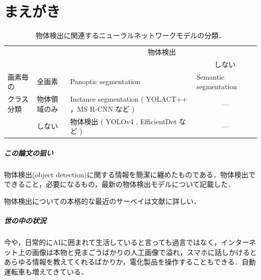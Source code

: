 \documentclass[twocolumn]{jsarticle} %
\begin{document}
\section{まえがき}
\begin{table}
    \caption{物体検出に関連するニューラルネットワークモデルの分類．}
    \label{tbl-select-l}
    \begin{center}
        \setlength{\doublerulesep}{0.5pt}
        \begin{tabularx}{\linewidth}{|p{1.7cm}|p{1.0cm}||X|p{3.6cm}|} \hline
            \multicolumn{2}{|c||}{} & \multicolumn{2}{c|}{物体検出} \\ \cline{3-4}
            \multicolumn{2}{|l||}{} & \centering{する} & \multicolumn{1}{c|}{しない} \\ \hline\hline
            画素毎の & 全画素 & Panoptic segmentation \cite{KHGRD19} & Semantic segmentation \\ \cline{2-4}
            クラス分類 & 物体領域のみ  & Instance segmentation ( YOLACT++ \cite{BZXL20}，MS R-CNN \cite{HHGHW19} など ) &  \multicolumn{1}{c|}{---} \\ \cline{2-4}
            & しない & 物体検出 ( YOLOv4 \cite{BWL20}, EfficientDet \cite{TPL20} など ) & \multicolumn{1}{c|}{---} \\ 
            \hline
        \end{tabularx}
    \end{center}
\end{table}

\subparagraph{この論文の狙い} 物体検出(object detection)に関する情報を簡潔に纏めたものである．物体検出でできること，必要になるもの，最新の物体検出モデルについて記載した．

物体検出についての本格的な最近のサーベイは文献\cite{JZLYLFQ19}に詳しい．

\subparagraph{世の中の状況} 
今や，日常的にAIに囲まれて生活していると言っても過言ではなく，インターネット上の画像は本物と見まごうばかりの人工画像で溢れ，スマホに話しかけるとあらゆる情報を教えてくれるばかりか，電化製品を操作することもできる．自動運転車も増えてきている．
\end{document}
